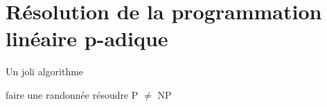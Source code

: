 \section{Résolution de la programmation linéaire \texorpdfstring{p}{$p$}-adique} 

\begin{algorithm}
\caption{Un joli algorithme}
\begin{algorithmic}
\REPEAT
  \STATE faire une randonnée
  \STATE résoudre P $\neq$ NP
 \ENDIF
{}
\end{algorithmic}
\end{algorithm}
